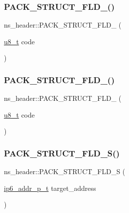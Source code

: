 \subsubsection{\texorpdfstring{P\+A\+C\+K\+\_\+\+S\+T\+R\+U\+C\+T\+\_\+\+F\+L\+D\+\_()}{PACK\_STRUCT\_FLD\_8()}\hspace{0.1cm}{\footnotesize\ttfamily [3/4]}}
{\footnotesize\ttfamily ns\+\_\+header\+::\+P\+A\+C\+K\+\_\+\+S\+T\+R\+U\+C\+T\+\_\+\+F\+L\+D\+\_ (\begin{DoxyParamCaption}\item[{\hyperlink{group__compiler__abstraction_ga4caecabca98b43919dd11be1c0d4cd8e}{u8\+\_\+t}}]{code }\end{DoxyParamCaption})}

\mbox{\label{structns__header_a24242894e6f1324a608b942c987f9992}} 
\subsubsection{\texorpdfstring{P\+A\+C\+K\+\_\+\+S\+T\+R\+U\+C\+T\+\_\+\+F\+L\+D\+\_()}{PACK\_STRUCT\_FLD\_8()}\hspace{0.1cm}{\footnotesize\ttfamily [4/4]}}
{\footnotesize\ttfamily ns\+\_\+header\+::\+P\+A\+C\+K\+\_\+\+S\+T\+R\+U\+C\+T\+\_\+\+F\+L\+D\+\_ (\begin{DoxyParamCaption}\item[{\hyperlink{group__compiler__abstraction_ga4caecabca98b43919dd11be1c0d4cd8e}{u8\+\_\+t}}]{code }\end{DoxyParamCaption})}

\mbox{\label{structns__header_a9afca416f5a3caff1d19744d8f89a571}} 
\subsubsection{\texorpdfstring{P\+A\+C\+K\+\_\+\+S\+T\+R\+U\+C\+T\+\_\+\+F\+L\+D\+\_\+\+S()}{PACK\_STRUCT\_FLD\_S()}\hspace{0.1cm}{\footnotesize\ttfamily [1/2]}}
{\footnotesize\ttfamily ns\+\_\+header\+::\+P\+A\+C\+K\+\_\+\+S\+T\+R\+U\+C\+T\+\_\+\+F\+L\+D\+\_\+S (\begin{DoxyParamCaption}\item[{\hyperlink{native_2lwip_2src_2include_2lwip_2prot_2ip6_8h_a560932a657f17ec5a0a3a78a1ce7e60a}{ip6\+\_\+addr\+\_\+p\+\_\+t}}]{target\+\_\+address }\end{DoxyParamCaption})}

